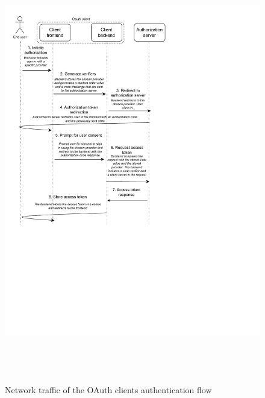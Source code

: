 \begin{figure}[b]
	\centering
    \includegraphics[height=185mm]{assets/client_request_flow.drawio.pdf}
	\caption{Network traffic of the OAuth clients authentication flow}
	\label{client_auth_requests}
\end{figure}

